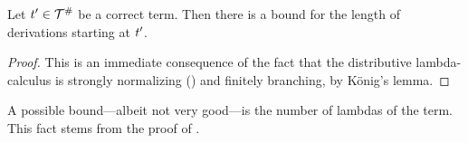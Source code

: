 \begin{corollary}
Let $t' \in \mathcal{T}^{\mathtt{\#}}$ be a correct term.
Then there is a bound for the length of derivations starting at $t'$.
\end{corollary}
\begin{proof}
This is an immediate consequence of the fact that the distributive lambda-calculus
is strongly normalizing () and finitely branching, by K\"onig's lemma.
\end{proof}

\begin{remark}
A possible bound---albeit not very good---is the number of lambdas of the term.
This fact stems from the proof of .
\end{remark}


